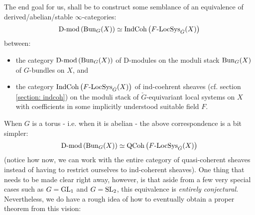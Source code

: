         The end goal for us, shall be to construct some semblance of an equivalence of derived/abelian/stable $\infty$-categories:
            $$\mathrm{D}\text{-}\mathrm{mod}\left(\mathrm{Bun}_G(X)\right) \simeq \mathrm{Ind}\mathrm{Coh}\left(F\text{-}\mathrm{LocSys}_{\check{G}}(X)\right)$$
        between:
            \begin{itemize}
                \item the category $\mathrm{D}\text{-}\mathrm{mod}\left(\mathrm{Bun}_G(X)\right)$ of D-modules on the moduli stack $\mathrm{Bun}_G(X)$ of $G$-bundles on $X$, and
                \item the category $\mathrm{Ind}\mathrm{Coh}\left(F\text{-}\mathrm{LocSys}_{\check{G}}(X)\right)$ of ind-coehrent sheaves (cf. section \ref{section: indcoh}) on the moduli stack of $\check{G}$-equivariant local systems on $X$ with coefficients in some implicitly understood suitable field $F$. 
            \end{itemize}
        When $G$ is a torus - i.e. when it is abelian - the above correspondence is a bit simpler:
            $$\mathrm{D}\text{-}\mathrm{mod}\left(\mathrm{Bun}_G(X)\right) \simeq \mathrm{QCoh}\left(F\text{-}\mathrm{LocSys}_{\check{G}}(X)\right)$$
        (notice how now, we can work with the entire category of quasi-coherent sheaves instead of having to restrict ourselves to ind-coherent sheaves). One thing that needs to be made clear right away, however, is that aside from a few very special cases such as $G = \operatorname{GL}_1$ and $G = \operatorname{SL}_2$, this equivalence is \textit{entirely conjectural}. Nevertheless, we do have a rough idea of how to eventually obtain a proper theorem from this vision:
